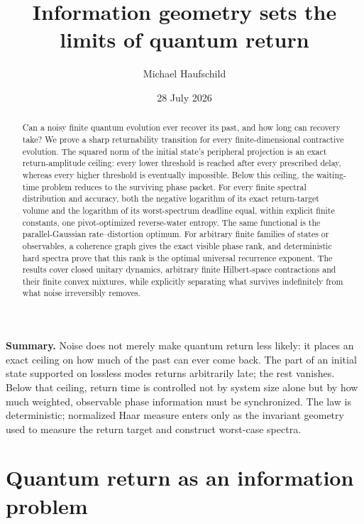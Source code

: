 \documentclass[10pt]{article}
\title{\textbf{Information geometry sets the limits of quantum return}}
\author{Michael Haufschild}
\date{28 July 2026}
\theoremstyle{definition}
\begin{document}
\maketitle

\begin{abstract}
Can a noisy finite quantum evolution ever recover its past, and how long can
recovery take?  We prove a sharp returnability transition for every
finite-dimensional contractive evolution.  The squared norm of the initial
state's peripheral projection is an exact return-amplitude ceiling: every
lower threshold is reached after every prescribed delay, whereas every higher
threshold is eventually impossible.  Below this ceiling, the waiting-time
problem reduces to the surviving phase packet.  For every finite spectral
distribution and accuracy, both the negative logarithm of its exact
return-target volume and the logarithm of its worst-spectrum deadline equal,
within explicit finite constants, one pivot-optimized reverse-water entropy.
The same functional is the parallel-Gaussian rate--distortion optimum.  For
arbitrary finite families of states or observables, a coherence graph gives
the exact visible phase rank, and deterministic hard spectra prove that this
rank is the optimal universal recurrence exponent.  The results cover closed
unitary dynamics, arbitrary finite Hilbert-space contractions and their finite
convex mixtures, while explicitly separating what survives indefinitely from
what noise irreversibly removes.
\end{abstract}

\noindent\textbf{Summary.}
Noise does not merely make quantum return less likely: it places an exact
ceiling on how much of the past can ever come back.  The part of an initial
state supported on lossless modes returns arbitrarily late; the rest vanishes.
Below that ceiling, return time is controlled not by system size alone but by
how much weighted, observable phase information must be synchronized.  The
law is deterministic; normalized Haar measure enters only as the invariant
geometry used to measure the return target and construct worst-case spectra.

\section*{Quantum return as an information problem}
\end{document}
